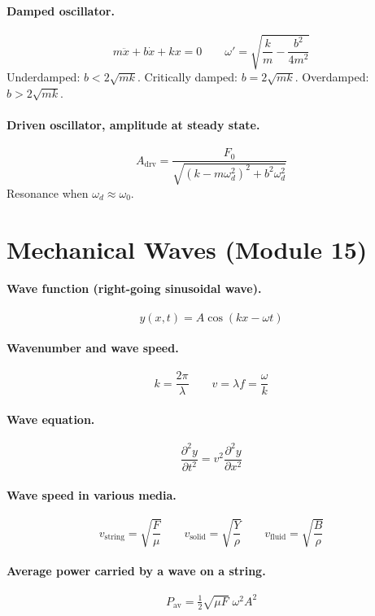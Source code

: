 \documentclass[11pt]{article}
\begin{document}
\paragraph{Damped oscillator.}
\[
m\ddot{x} + b\dot{x} + kx = 0
\qquad
\omega' = \sqrt{\frac{k}{m} - \frac{b^{2}}{4 m^{2}}}
\]
Underdamped: $b < 2\sqrt{mk}$. Critically damped: $b = 2\sqrt{mk}$. Overdamped: $b > 2\sqrt{mk}$.

\paragraph{Driven oscillator, amplitude at steady state.}
\[
A_{\text{drv}} = \frac{F_{0}}{\sqrt{(k - m\omega_{d}^{2})^{2} + b^{2}\omega_{d}^{2}}}
\]
Resonance when $\omega_{d} \approx \omega_{0}$.

\section*{Mechanical Waves (Module 15)}

\paragraph{Wave function (right-going sinusoidal wave).}
\[
y(x,t) = A\cos(kx - \omega t)
\]

\paragraph{Wavenumber and wave speed.}
\[
k = \frac{2\pi}{\lambda}
\qquad
v = \lambda f = \frac{\omega}{k}
\]

\paragraph{Wave equation.}
\[
\frac{\partial^{2} y}{\partial t^{2}} = v^{2}\frac{\partial^{2} y}{\partial x^{2}}
\]

\paragraph{Wave speed in various media.}
\[
v_{\text{string}} = \sqrt{\frac{F}{\mu}}
\qquad
v_{\text{solid}} = \sqrt{\frac{Y}{\rho}}
\qquad
v_{\text{fluid}} = \sqrt{\frac{B}{\rho}}
\]

\paragraph{Average power carried by a wave on a string.}
\[
P_{\text{av}} = \tfrac{1}{2}\sqrt{\mu F}\;\omega^{2} A^{2}
\]
\end{document}

